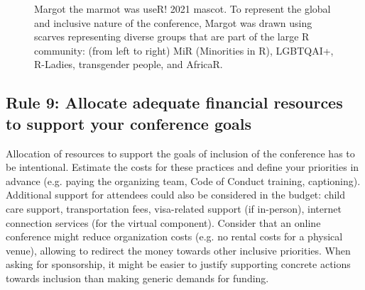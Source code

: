 \documentclass[10pt,letterpaper]{article}
\begin{document}
\begin{figure}[!h]
\centering
{}
\caption{Margot the marmot was useR! 2021 mascot. To represent the global and inclusive nature of the conference, Margot was drawn using scarves representing diverse groups that are part of the large R community: (from left to right) MiR (Minorities in R), LGBTQAI+, R-Ladies, transgender people, and AfricaR.} %
\label{fig:marmots}
\end{figure}

\subsection*{Rule 9: Allocate adequate financial resources to support your conference goals}
\label{rule_financial}

Allocation of resources to support the goals of inclusion of the conference has to be intentional. 
Estimate the costs for these practices and define your priorities in advance (e.g. paying the organizing team, Code of Conduct training, captioning).
Additional support for attendees could also be considered in the budget: child care support, transportation fees, visa-related support (if in-person), internet connection services (for the virtual component). 
Consider that an online conference might reduce organization costs (e.g. no rental costs for a physical venue), allowing to redirect the money towards other inclusive priorities. 
When asking for sponsorship, it might be easier to justify supporting concrete actions towards inclusion than making generic demands for funding.
\end{document}
